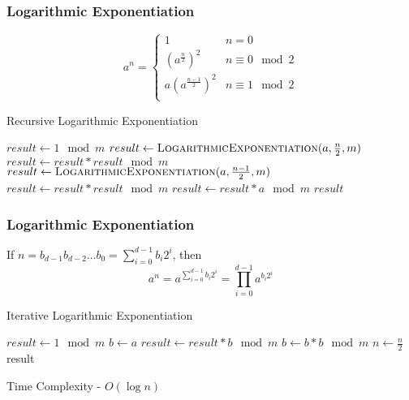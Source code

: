 \documentclass{beamer}
\begin{document}
\begin{frame}
\frametitle{Logarithmic Exponentiation}

\[a^n = \begin{cases} 
      1 & n = 0 \\
      (a^{\frac n 2})^2 & n \equiv 0 \mod 2 \\
      a(a^{\frac {n-1} 2})^2 & n \equiv 1 \mod 2 \\
   \end{cases}
\]

\begin{algorithm}[H]
\caption{Recursive Logarithmic Exponentiation}
\label{alg:RecursiveLogarithmicExponentiation}
\begin{algorithmic}
\State $result \gets 1 \mod m$ 
	\State $result \gets \Call{LogarithmicExponentiation}{a, \frac n 2, m}$
	\State $result \gets result * result \mod m$
	\State $result \gets \Call{LogarithmicExponentiation}{a, \frac {n-1} 2, m}$
	\State $result \gets result * result \mod m$
	\State $result \gets result * a \mod m$
\EndIf
\State \Return $result$
\EndProcedure
\end{algorithmic}
\end{algorithm}

\end{frame}

\begin{frame}
\frametitle{Logarithmic Exponentiation}

If $n = b_{d-1}b_{d-2}\dots b_{0} = \sum_{i=0}^{d-1}b_i 2^i$, then
\[a^n = a^{\sum_{i=0}^{d-1}b_i 2^i} = \prod_{i=0}^{d-1} a^{b_i 2^i}\]

\begin{algorithm}[H]
\caption{Iterative Logarithmic Exponentiation}
\label{alg:IterativeLogarithmicExponentiation}
\begin{algorithmic}
\State $result \gets 1 \mod m$ 
\State $b \gets a$
 
	\State $result \gets result * b \mod m$ 
\EndIf
\State $b \gets b * b \mod m$ 
\State $n \gets \frac n 2$ 
\EndWhile \label{euclidendwhile}
\State \Return result
\EndProcedure
\end{algorithmic}
\end{algorithm}
Time Complexity - $O(\log n)$
\end{frame}
\end{document}
